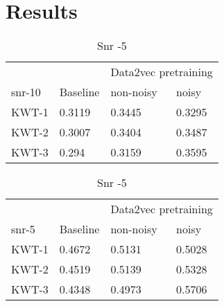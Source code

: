 \section{Results}
\begin{table}[ht]
    \centering
    \begin{subtable}[ht]{0.45\textwidth}
        \centering
        \begin{tabular}{@{}llll@{}}
        \toprule
        & & \multicolumn{2}{c}{Data2vec pretraining} \\ \cline{3-4}
        snr-10    & Baseline & non-noisy & noisy \\ \midrule
        KWT-1    & 0.3119  & 0.3445 & 0.3295 \\
        KWT-2    & 0.3007  & 0.3404 & 0.3487 \\
        KWT-3    & 0.294  & 0.3159 & 0.3595 \\
        \bottomrule
        \end{tabular}
        \caption{Snr -10}
    \end{subtable}
    \hfill
    \begin{subtable}[ht]{0.45\textwidth}
        \centering
        \begin{tabular}{@{}llll@{}}
        \toprule
        & & \multicolumn{2}{c}{Data2vec pretraining} \\ \cline{3-4}
        snr-5    & Baseline & non-noisy & noisy \\ \midrule
        KWT-1    & 0.4672  & 0.5131 & 0.5028 \\
        KWT-2    & 0.4519  & 0.5139 & 0.5328 \\
        KWT-3    & 0.4348  & 0.4973 & 0.5706 \\
        \bottomrule
        \end{tabular}
        \caption{Snr -5}
    \end{subtable}
     
     
    \bigskip



\end{table}
